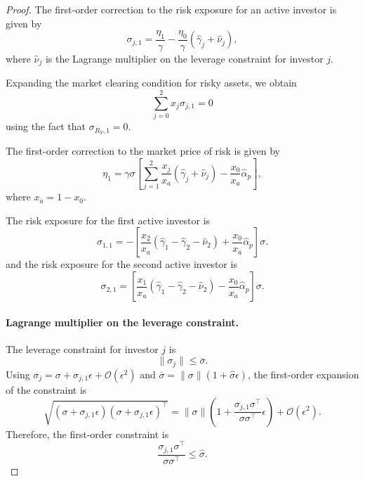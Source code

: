 \begin{proof}
The first-order correction to the risk exposure for an active investor is given by
\begin{equation}
    \sigma_{j,1} = \frac{\eta_1}{\gamma} - \frac{\eta_0}{\gamma} (\hat{\gamma}_j+ \hat{\nu}_{j}),
\end{equation}
where $\hat{\nu}_{j}$ is the Lagrange multiplier on the leverage constraint for investor $j$.

Expanding the market clearing condition for risky assets, we obtain
\begin{equation}
    \sum_{j=0}^2 x_{j} \sigma_{j,1} = 0
\end{equation}
using the fact that $\sigma_{R_Y,1} = 0$.

The first-order correction to the market price of risk is given by
\begin{equation}
   \eta_1  =  \gamma \sigma \left[\sum_{j=1}^2 \frac{x_j}{x_a}(\hat{\gamma}_j+ \hat{\nu}_{j}) -\frac{x_0}{x_a}\hat{\alpha}_{p} \right],
\end{equation}
where $x_a = 1 - x_0$.

The risk exposure for the first active investor is
\begin{equation}
    \sigma_{1,1} = - \left[ \frac{x_2}{x_a}\left(\hat{\gamma}_1 - \hat{\gamma}_2-\hat{\nu}_{2}\right) +\frac{x_0}{x_a}\hat{\alpha}_{p} \right]\sigma.
\end{equation}
and the risk exposure for the second active investor is
\begin{equation}
    \sigma_{2,1} = \left[ \frac{x_1}{x_a}\left(\hat{\gamma}_1 - \hat{\gamma}_2 - \hat{\nu}_{2}\right)-\frac{x_0}{x_a}\hat{\alpha}_{p}  \right]\sigma.
\end{equation}

\paragraph{Lagrange multiplier on the leverage constraint.}
The leverage constraint for investor $j$ is
\begin{equation}
    \|\sigma_j\| \leq \overline{\sigma}.
\end{equation}
Using $\sigma_j=\sigma+\sigma_{j,1}\epsilon+\mathcal{O}(\epsilon^2)$ and $\overline{\sigma}=\|\sigma\|(1+\hat{\sigma}\epsilon)$, the first-order expansion of the constraint is
\begin{equation}
    \sqrt{(\sigma+\sigma_{j,1}\epsilon)(\sigma+\sigma_{j,1}\epsilon)^\top}
    = \|\sigma\|\left(1+\frac{\sigma_{j,1}\sigma^\top}{\sigma\sigma^\top}\epsilon\right)
    +\mathcal{O}(\epsilon^2).
\end{equation}
Therefore, the first-order constraint is
\begin{equation}
    \frac{\sigma_{j,1}\sigma^\top}{\sigma\sigma^\top} \leq \hat{\sigma}.
\end{equation}


\end{proof}
